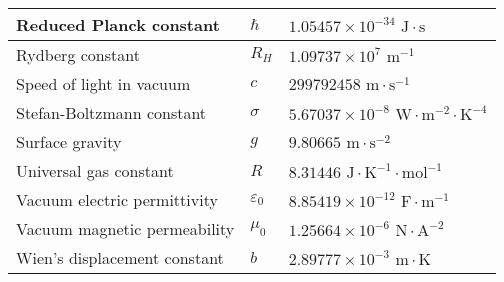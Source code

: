 \documentclass[../main_physics.tex]{subfiles}
\begin{document}
\begin{center}
\begin{tabular}{|l|l|l|}
    \hline
    Reduced Planck constant                  & $\hbar$                               & $1.05457\times 10^{-34}\text{ J}\cdot\text{s}$                           \\
    \hline
    Rydberg constant                         & $R_H$                                 & $1.09737\times 10^7\text{ m}^{-1}$                                       \\
    \hline
    Speed of light in vacuum                 & $c$                                   & $299792458\text{ m}\cdot\text{s}^{-1}$                                   \\
    \hline
    Stefan-Boltzmann constant                & $\sigma$                              & $5.67037\times 10^{-8}\text{ W}\cdot\text{m}^{-2}\cdot\text{K}^{-4}$     \\
    \hline
    Surface gravity                          & $g$                                   & $9.80665\text{ m}\cdot\text{s}^{-2}$                                     \\
    \hline
    Universal gas constant                   & $R$                                   & $8.31446\text{ J}\cdot\text{K}^{-1}\cdot\text{mol}^{-1}$                 \\
    \hline
    Vacuum electric permittivity             & $\varepsilon_0$                       & $8.85419\times 10^{-12}\text{ F}\cdot\text{m}^{-1}$                      \\
    \hline
    Vacuum magnetic permeability             & $\mu_0$                               & $1.25664\times 10^{-6}\text{ N}\cdot\text{A}^{-2}$                       \\
    \hline
    Wien's displacement constant             & $b$                                   & $2.89777\times 10^{-3}\text{ m}\cdot\text{K}$                            \\
    \hline
  \end{tabular}
\end{center}
\end{document}

